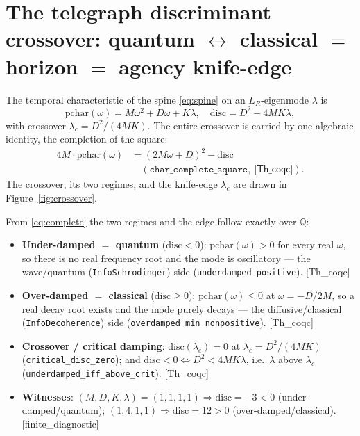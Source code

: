 \documentclass[10pt,twocolumn]{article}
\theoremstyle{definition}
\newcommand{\Thq}{\textsf{[Th\_coqc]}}
\newcommand{\Fin}{\textsf{[finite\_diagnostic]}}
\newcommand{\code}[1]{\texttt{#1}}
\newcommand{\LR}{L_{R}}
\begin{document}
\section{The telegraph discriminant crossover: quantum $\leftrightarrow$ classical
  $=$ horizon $=$ agency knife-edge}\label{sec:crossover}

The temporal characteristic of the spine \eqref{eq:spine} on an $\LR$-eigenmode $\lambda$ is
\begin{equation}\label{eq:pchar}
\mathrm{pchar}(\omega) = M\omega^2 + D\omega + K\lambda,\quad
\mathrm{disc} = D^2 - 4MK\lambda,
\end{equation}
with crossover $\lambda_c = D^2/(4MK)$. The entire crossover is carried by one algebraic
identity, the completion of the square:
\begin{equation}\label{eq:complete}
\begin{aligned}
4M\cdot\mathrm{pchar}(\omega) &= (2M\omega + D)^2 - \mathrm{disc}\\
&\quad(\code{char\_complete\_square},\ \Thq{}).
\end{aligned}
\end{equation}
The crossover, its two regimes, and the knife-edge $\lambda_c$ are drawn in
Figure~\ref{fig:crossover}.



From \eqref{eq:complete} the two regimes and the edge follow exactly over $\mathbb{Q}$:
\begin{itemize}\itemsep2pt
\item \textbf{Under-damped $=$ quantum} ($\mathrm{disc}<0$): $\mathrm{pchar}(\omega)>0$ for
  every real $\omega$, so there is no real frequency root and the mode is oscillatory ---
  the wave/quantum (\code{InfoSchrodinger}) side (\code{underdamped\_positive}). \Thq{}
\item \textbf{Over-damped $=$ classical} ($\mathrm{disc}\ge 0$): $\mathrm{pchar}(\omega)\le 0$
  at $\omega=-D/2M$, so a real decay root exists and the mode purely decays --- the
  diffusive/classical (\code{InfoDecoherence}) side
  (\code{overdamped\_min\_nonpositive}). \Thq{}
\item \textbf{Crossover / critical damping}: $\mathrm{disc}(\lambda_c)=0$ at
  $\lambda_c=D^2/(4MK)$ (\code{critical\_disc\_zero}); and $\mathrm{disc}<0 \iff D^2<4MK\lambda$,
  i.e.\ $\lambda$ above $\lambda_c$ (\code{underdamped\_iff\_above\_crit}). \Thq{}
\item \textbf{Witnesses}: $(M,D,K,\lambda)=(1,1,1,1)\Rightarrow \mathrm{disc}=-3<0$
  (under-damped/quantum); $(1,4,1,1)\Rightarrow \mathrm{disc}=12>0$
  (over-damped/classical). \Fin{}
\end{itemize}
\end{document}
